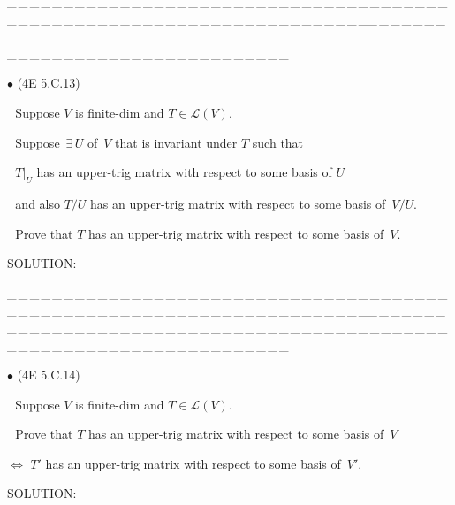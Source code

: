 \documentclass[a4paper, 11pt, UTF8]{article}
\def\Lm{\mathcal{L}}
\begin{document}
\begin{large}
\par
{\tiny \_\,\_\,\_\,\_\,\_\,\_\,\_\,\_\,\_\,\_\,\_\,\_\,\_\,\_\,\_\,\_\,\_\,\_\,\_\,\_\,\_\,\_\,\_\,\_\,\_\,\_\,\_\,\_\,\_\,\_\,\_\,\_\,\_\,\_\,\_\,\_\,\_\,\_\,\_\,\_\,\_\,\_\,\_\,\_\,\_\,\_\,\_\,\_\,\_\,\_\,\_\,\_\,\_\,\_\,\_\,\_\,\_\,\_\,\_\,\_\,\_\,\_\,\_\,\_\,\_\,\_\,\_\,\_\,\_\,\_\,\_\_\,\_\,\_\,\_\,\_\,\_\,\_\,\_\,\_\,\_\,\_\,\_\,\_\,\_\,\_\,\_\,\_\,\_\,\_\,\_\,\_\,\_\,\_\,\_\,\_\,\_\,\_\,\_\,\_\,\_\,\_\,\_\,\_\,\_\,\_\,\_\,\_\,\_\,\_\,\_\,\_\,\_\,\_\,\_\,\_\,\_\,\_\,\_\,\_\,\_\,\_\,\_\,\_\,\_\,\_\,\_\,\_\,\_\,\_\,\_\,\_\,\_\,\_\,\_\,\_\,\_\,\_\,\_\,\_\,\_\,\_}\par

{\small $\bullet$} (\normalsize{4E 5.C.13})\par\,\, {\timessl\Large 
Suppose $V$ is finite-dim and $T\in \Lm(V)$.}\par\,\,
{\timessl\Large Suppose $\,\exists\,U$ of \,$V$ that is invariant under $T$ such that}\par\,\,
{\timessl\Large $T|_U$ has an upper-trig matrix with respect to some basis of $U$}\par\,\,
{\timessl\Large and also $T/U$ has an upper-trig matrix with respect to some basis of \,$V/U$.}\par\,\,
{\timessl\Large Prove that $T$ has an upper-trig matrix with respect to some basis of \,$V$.
}\par
{\timesbf S\footnotesize{OLUTION:}}\par\quad

\par
{\tiny \_\,\_\,\_\,\_\,\_\,\_\,\_\,\_\,\_\,\_\,\_\,\_\,\_\,\_\,\_\,\_\,\_\,\_\,\_\,\_\,\_\,\_\,\_\,\_\,\_\,\_\,\_\,\_\,\_\,\_\,\_\,\_\,\_\,\_\,\_\,\_\,\_\,\_\,\_\,\_\,\_\,\_\,\_\,\_\,\_\,\_\,\_\,\_\,\_\,\_\,\_\,\_\,\_\,\_\,\_\,\_\,\_\,\_\,\_\,\_\,\_\,\_\,\_\,\_\,\_\,\_\,\_\,\_\,\_\,\_\,\_\_\,\_\,\_\,\_\,\_\,\_\,\_\,\_\,\_\,\_\,\_\,\_\,\_\,\_\,\_\,\_\,\_\,\_\,\_\,\_\,\_\,\_\,\_\,\_\,\_\,\_\,\_\,\_\,\_\,\_\,\_\,\_\,\_\,\_\,\_\,\_\,\_\,\_\,\_\,\_\,\_\,\_\,\_\,\_\,\_\,\_\,\_\,\_\,\_\,\_\,\_\,\_\,\_\,\_\,\_\,\_\,\_\,\_\,\_\,\_\,\_\,\_\,\_\,\_\,\_\,\_\,\_\,\_\,\_\,\_\,\_}\par

{\small $\bullet$} (\normalsize{4E 5.C.14})\par\,\, {\timessl\Large 
Suppose $V$ is finite-dim and $T\in \Lm(V)$.}\par\,\,
{\timessl\Large Prove that $T$ has an upper-trig matrix with respect to some basis of \,$V$}\par\qquad\quad
{\timessl\Large $\Longleftrightarrow$ $T'$ has an upper-trig matrix with respect to some basis of \,$V'$.
}\par
{\timesbf S\footnotesize{OLUTION:}}\par\quad


\end{large}
\end{document}
